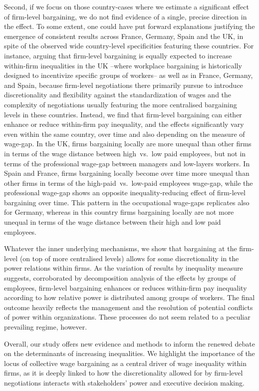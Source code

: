 \documentclass[12pt]{article}
\begin{document}
Second, if we focus on those country-cases where we estimate a
significant effect of firm-level bargaining, we do not find evidence
of a single, precise direction in the effect. To some extent, one
could have put forward explanations justifying the emergence of
consistent results across France, Germany, Spain and the UK, in spite
of the observed wide country-level specificities featuring these
countries. For instance, arguing that firm-level bargaining is equally
expected to increase within-firm inequalities in the UK --where
workplace bargaining is historically designed to incentivize specific
groups of workers-- as well as in France, Germany, and Spain, because
firm-level negotiations there primarily pursue to introduce
discretionality and flexibility against the standardization of wages
and the complexity of negotiations usually featuring the more
centralised bargaining levels in these countries. Instead, we find
that firm-level bargaining can either enhance or reduce within-firm
pay inequality, and the effects significantly vary even within the
same country, over time and also depending on the measure of wage-gap.
In the UK, firms bargaining locally are more unequal than other firms
in terms of the wage distance between high~vs.~low paid employees, but
not in terms of the professional wage-gap between managers and
low-layers workers. In Spain and France, firms bargaining locally
become over time more unequal than other firms in terms of the
high-paid~vs.~low-paid employees wage-gap, while the professional
wage-gap shows an opposite inequality-reducing effect of firm-level
bargaining over time. This pattern in the occupational wage-gaps
replicates also for Germany, whereas in this country firms bargaining
locally are not more unequal in terms of the wage distance between
their high and low paid employees.

Whatever the inner underlying mechanisms, we show that bargaining at
the firm-level (on top of more centralised levels) allows for some
discretionality in the power relations within firms. As the variation
of results by inequality measure suggests, corroborated by
decomposition analysis of the effects by groups of employees,
firm-level bargaining enhances or reduces within-firm pay inequality
according to how relative power is distributed among groups of
workers. The final outcome heavily reflects the management and the
resolution of potential conflicts of power within organizations. These
processes do not seem related to a peculiar prevailing regime,
however.

Overall, our study offers new evidence and methods to inform the
renewed debate on the determinants of increasing inequalities. We
highlight the importance of the locus of collective wage bargaining as
a central driver of wage inequality within firms, as it is deeply
linked to how the discretionality allowed for by firm-level
negotiations interacts with stakeholders' power and executive decision
making.
\end{document}
